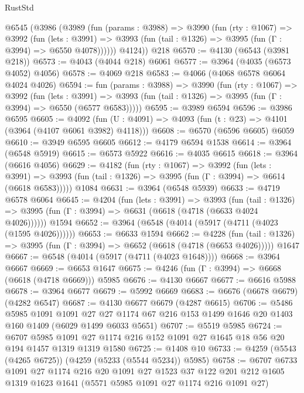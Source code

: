\begin{lexlean}{RustStd}
\begin{coremodule}
    @6545
      (@3986
        (@3989
          (fun (params : @3988) =>
          @3990
            (fun (rty : @1067) =>
            @3992
              (fun (lets : @3991) =>
              @3993 (fun (tail : @1326) => @3995 (fun (Γ : @3994) => @6550 @4078))))))
        @4124))
    @218
@6570 := @4130 (@6543 (@3981 @218))
@6573 := @4043 (@4044 @218) @6061
@6577 := @3964 (@4035 (@6573 @4052) @4056)
@6578 := @4069 @218
@6583 := @4066 (@4068 @6578 @6064 @4024 @4026)
@6594 := fun (params : @3988) =>
  @3990
    (fun (rty : @1067) =>
    @3992
      (fun (lets : @3991) =>
      @3993 (fun (tail : @1326) => @3995 (fun (Γ : @3994) => @6550 (@6577 @6583)))))
@6595 := @3989 @6594
@6596 := @3986 @6595
@6605 := @4092 (fun (U : @4091) => @4093 (fun (t : @23) => @4101 (@3964 (@4107 @6061 @3982) @4118)))
@6608 := @6570 (@6596 @6605) @6059
@6610 := @3949 @6595 @6605
@6612 := @4179 @6594 @1538
@6614 := @3964 (@6548 @5919)
@6615 := @6573 @5922
@6616 := @4035 @6615
@6618 := @3964 (@6616 @4056)
@6629 := @4182
    (fun (rty : @1067) =>
    @3992
      (fun (lets : @3991) =>
      @3993 (fun (tail : @1326) => @3995 (fun (Γ : @3994) => @6614 (@6618 @6583)))))
    @1084
@6631 := @3964 (@6548 @5939)
@6633 := @4719 @6578 @6064
@6645 := @4204
    (fun (lets : @3991) =>
    @3993
      (fun (tail : @1326) => @3995 (fun (Γ : @3994) => @6631 (@6618 (@4718 (@6633 @4024 @4026))))))
    @1594
@6652 := @3964 (@6548 (@4014 (@5917 (@4711 (@4023 (@1595 @4026))))))
@6653 := @6633 @1594
@6662 := @4228
    (fun (tail : @1326) => @3995 (fun (Γ : @3994) => @6652 (@6618 (@4718 (@6653 @4026)))))
    @1647
@6667 := @6548 (@4014 (@5917 (@4711 (@4023 @1648))))
@6668 := @3964 @6667
@6669 := @6653 @1647
@6675 := @4246 (fun (Γ : @3994) => @6668 (@6618 (@4718 @6669))) @5985
@6676 := @4130 @6667
@6677 := @6616 @5988
@6678 := @3964 @6677
@6679 := @5992 @6669
@6683 := @6676 (@6678 @6679) (@4282 @6547)
@6687 := @4130 @6677 @6679 (@4287 @6615)
@6706 := @5486
    @5985
    @1091
    @1091
    @27
    @27
    @1174
    @67
    @216
    @153
    @1499
    @1646
    @20
    @1403
    @160
    @1409
    (@6029 @1499 @6033 @5651)
@6707 := @5519 @5985
@6724 := @6707
    @5985
    @1091
    @27
    @1174
    @216
    @152
    @1091
    @27
    @1645
    @18
    @56
    @20
    @194
    @1457
    @1319
    @1319
    @1580
@6725 := @1408 @10
@6733 := @4259 (@5543 (@4265 @6725)) (@4259 (@5233 (@5544 @5234)) @5985)
@6758 := @6707
    @6733
    @1091
    @27
    @1174
    @216
    @20
    @1091
    @27
    @1523
    @37
    @122
    @201
    @212
    @1605
    @1319
    @1623
    @1641
    (@5571 @5985 @1091 @27 @1174 @216 @1091 @27)

\end{coremodule}
\end{lexlean}
